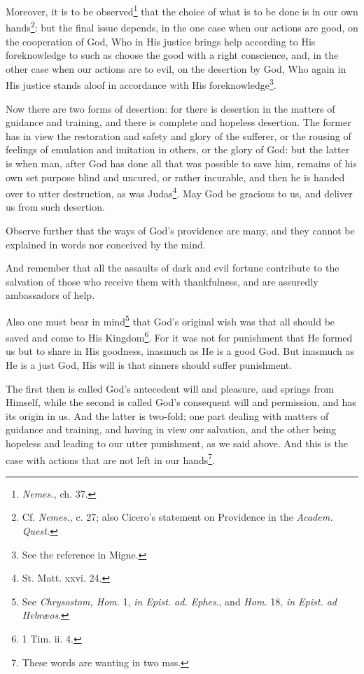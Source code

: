 Moreover, it is to be observed\footnote{\emph{Nemes., }ch. 37.} that the choice of what is to be done is in our own hands\footnote{Cf. \emph{Nemes., }c. 27; also Cicero’s statement on Providence in the \emph{Academ. Quest.}}: but the final issue depends, in the one case when our actions are good, on the cooperation of God, Who in His justice brings help according to His foreknowledge to such as choose the good with a right conscience, and, in the other case when our actions are to evil, on the desertion by God, Who again in His justice stands aloof in accordance with His foreknowledge\footnote{See the reference in Migne.}.

Now there are two forms of desertion: for there is desertion in the matters of guidance and training, and there is complete and hopeless desertion. The former has in view the restoration and safety and glory of the sufferer, or the rousing of feelings of emulation and imitation in others, or the glory of God: but the latter is when man, after God has done all that was possible to save him, remains of his own set purpose blind and uncured, or rather incurable, and then he is handed over to utter destruction, as was Judas\footnote{St. Matt. xxvi. 24.}. May God be gracious to us, and deliver us from such desertion.

Observe further that the ways of God’s providence are many, and they cannot be explained in words nor conceived by the mind.

And remember that all the assaults of dark and evil fortune contribute to the salvation of those who receive them with thankfulness, and are assuredly ambassadors of help.

Also one must bear in mind\footnote{See \emph{Chrysostom, Hom. }1, \emph{in Epist. ad. Ephes}., and \emph{Hom.} 18, \emph{in Epist. ad Hebræos}.} that God’s original wish was that all should be saved and come to His Kingdom\footnote{1 Tim. ii. 4.}. For it was not for punishment that He formed us but to share in His goodness, inasmuch as He is a good God. But inasmuch as He is a just God, His will is that sinners should suffer punishment.

The first then is called God’s antecedent will and pleasure, and springs from Himself, while the second is called God’s consequent will and permission, and has its origin in us. And the latter is two-fold; one part dealing with matters of guidance and training, and having in view our salvation, and the other being hopeless and leading to our utter punishment, as we said above. And this is the case with actions that are not left in our hands\footnote{These words are wanting in two mss.}.

